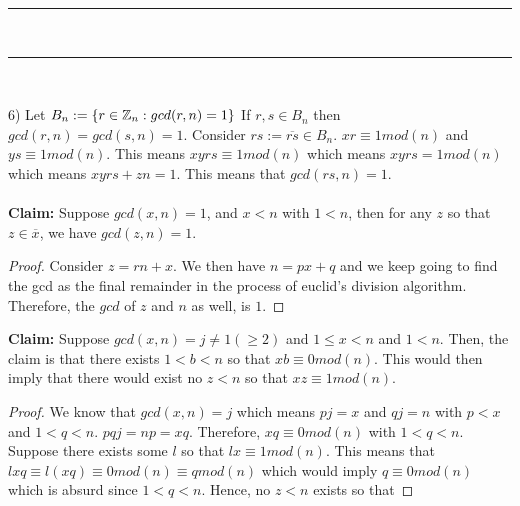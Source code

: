 \documentclass[../Main.tex]{subfiles}
\begin{document}
\begin{center}    
    \rule[1ex]{.8\textwidth}{1pt}\\
    \rule[1.9ex]{.7\textwidth}{.6pt}\\[-6pt]
    
\end{center}
6) Let $B_n:=\{r \in \mathbb Z_n: gcd(r,n)=1\}$
If $r, s \in B_n$ then $gcd(r,n)=gcd(s,n)=1$. Consider $rs:= \overline{rs} \in B_n$. $xr \equiv 1 mod(n)$ and $ys \equiv 1 mod(n)$. This means $xy rs \equiv 1 mod(n)$ which means $xy rs=1 mod(n)$ which means $xy rs +zn=1$. This means that $gcd(rs,n)=1$.
\\\\ \textbf{Claim:} Suppose $gcd(x,n)=1$, and $x< n$ with $1<n$, then for any $z$ so that $z \in \overline{x}$, we have $gcd(z,n)=1$. 
\\ \begin{proof}
Consider $z=rn+x$. We then have $n=px+q$ and we keep going to find the gcd as the final remainder in the process of euclid's division algorithm. Therefore, the $gcd$ of $z$ and $n$ as well, is $1$. 
\end{proof}

\textbf{Claim:} Suppose $gcd(x,n)=j \neq 1(\geq 2)$ and $1 \leq x <n$ and $1<n$. Then, the claim is that there exists $1<b<n$ so that $xb\equiv 0 mod(n)$. This would then imply that there would exist no $z<n$ so that $xz\equiv 1mod(n)$.
\\ \begin{proof}
We know that $gcd(x,n)=j$ which means $pj=x$ and $qj=n$ with $p<x$ and $1<q<n$. $pqj=np=xq$. Therefore, $xq\equiv 0 mod(n)$ with $1<q<n$. Suppose there exists some $l$ so that $lx\equiv 1 mod(n)$. This means that $lxq\equiv l(xq) \equiv 0 mod(n) \equiv q mod(n)$ which would imply $q\equiv 0 mod(n)$ which is absurd since $1<q<n$. Hence, no $z<n$ exists so that  
\end{proof}  
\end{document}
